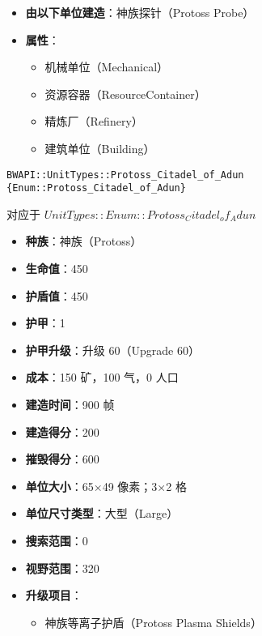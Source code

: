 \begin{tcolorbox}[colback=white, colframe=black!60!white, title=Protoss\_Assimilator(), arc=0mm]
\begin{itemize}
        \item \textbf{由以下单位建造}：神族探针（Protoss Probe）
        \item \textbf{属性}：
            \begin{itemize}
                \item 机械单位（Mechanical）
                \item 资源容器（ResourceContainer）
                \item 精炼厂（Refinery）
                \item 建筑单位（Building）
            \end{itemize}
    \end{itemize}
\end{tcolorbox}

\begin{tcolorbox}[colback=white, colframe=black!60!white, title=Protoss\_Citadel\_of\_Adun(), arc=0mm]
    \begin{verbatim}
BWAPI::UnitTypes::Protoss_Citadel_of_Adun {Enum::Protoss_Citadel_of_Adun}
    \end{verbatim}
    对应于  $ UnitTypes::Enum::Protoss_Citadel_of_Adun $ 
    \begin{itemize}
        \item \textbf{种族}：神族（Protoss）
        \item \textbf{生命值}：450
        \item \textbf{护盾值}：450
        \item \textbf{护甲}：1
        \item \textbf{护甲升级}：升级 60（Upgrade 60）
        \item \textbf{成本}：150 矿，100 气，0 人口
        \item \textbf{建造时间}：900 帧
        \item \textbf{建造得分}：200
        \item \textbf{摧毁得分}：600
        \item \textbf{单位大小}：65×49 像素；3×2 格
        \item \textbf{单位尺寸类型}：大型（Large）
        \item \textbf{搜索范围}：0
        \item \textbf{视野范围}：320
        \item \textbf{升级项目}：
            \begin{itemize}
                \item 神族等离子护盾（Protoss Plasma Shields）
            \end{itemize}

\end{itemize}
\end{tcolorbox}

